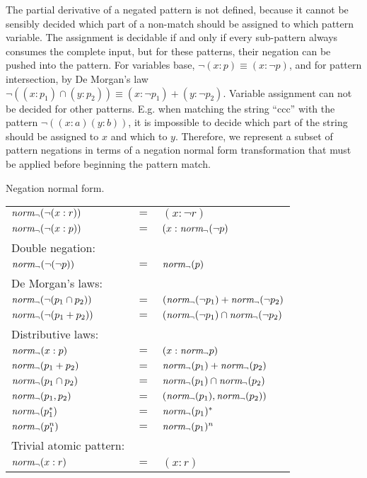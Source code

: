 The partial derivative of a negated pattern is not defined, because it cannot
be sensibly decided which part of a non-match should be assigned to which
pattern variable. The assignment is decidable if and only if every sub-pattern
always consumes the complete input, but for these patterns, their negation can
be pushed into the pattern. For variables base, $\neg(x:p) \equiv (x:\neg p)$,
and for pattern intersection, by De Morgan's law $\neg((x:p_1) \cap (y:p_2))
\equiv (x:\neg p_1) + (y:\neg p_2)$. Variable assignment can not be decided
for other patterns. E.g. when matching the string ``ccc'' with the pattern
$\neg((x:a)(y:b))$, it is impossible to decide which part of the string should
be assigned to $x$ and which to $y$. Therefore, we represent a subset of
pattern negations in terms of a negation normal form transformation that must
be applied before beginning the pattern match.

\needspace{4cm}

\begin{defn}
   \label{defn-negnorm}
   Negation normal form.

   \begin{tabular}{lll}
      $\mathit{norm_\neg}(\neg(x : r))$		& $=$	& $(x : \neg r)$					\\
      $\mathit{norm_\neg}(\neg(x : p))$		& $=$	& $(x : \mathit{norm_\neg}(\neg p)$				\\
      Double negation:			&	&							\\
      $\mathit{norm_\neg}(\neg(\neg p))$		& $=$	& $\mathit{norm_\neg}(p)$						\\
      De Morgan's laws:			&	&							\\
      $\mathit{norm_\neg}(\neg(p_1 \cap p_2))$	& $=$	& $(\mathit{norm_\neg}(\neg p_1) + \mathit{norm_\neg}(\neg p_2)$		\\
      $\mathit{norm_\neg}(\neg(p_1 + p_2))$	& $=$	& $(\mathit{norm_\neg}(\neg p_1) \cap \mathit{norm_\neg}(\neg p_2)$		\\
      Distributive laws:		&	&							\\
      $\mathit{norm_\neg}(x : p)$			& $=$	& $(x : \mathit{norm_\neg} p)$					\\
      $\mathit{norm_\neg}(p_1 + p_2)$		& $=$	& $\mathit{norm_\neg}(p_1) + \mathit{norm_\neg}(p_2)$			\\
      $\mathit{norm_\neg}(p_1 \cap p_2)$		& $=$	& $\mathit{norm_\neg}(p_1) \cap \mathit{norm_\neg}(p_2)$			\\
      $\mathit{norm_\neg}(p_1, p_2)$		& $=$	& $(\mathit{norm_\neg}(p_1), \mathit{norm_\neg}(p_2))$			\\
      $\mathit{norm_\neg}(p_1^*)$			& $=$	& $\mathit{norm_\neg}(p_1)^*$					\\
      $\mathit{norm_\neg}(p_1^n)$			& $=$	& $\mathit{norm_\neg}(p_1)^n$					\\
      Trivial atomic pattern:		&	&							\\
      $\mathit{norm_\neg}(x : r)$			& $=$	& $(x : r)$						\\
   \end{tabular}
\end{defn}

